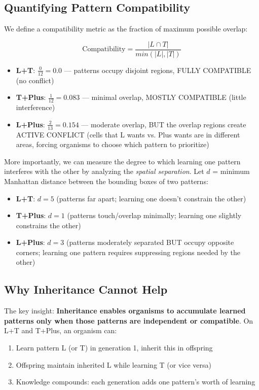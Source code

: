 \documentclass[12pt]{article}
\begin{document}
\subsection*{Quantifying Pattern Compatibility}

We define a compatibility metric as the fraction of maximum possible overlap:

\begin{equation}
\text{Compatibility} = \frac{|L \cap T|}{min(|L|, |T|)}
\end{equation}

\begin{itemize}
\item \textbf{L+T}: $\frac{0}{12} = 0.0$ — patterns occupy disjoint regions, FULLY COMPATIBLE (no conflict)
\item \textbf{T+Plus}: $\frac{1}{12} = 0.083$ — minimal overlap, MOSTLY COMPATIBLE (little interference)
\item \textbf{L+Plus}: $\frac{2}{13} = 0.154$ — moderate overlap, BUT the overlap regions create ACTIVE CONFLICT (cells that L wants vs. Plus wants are in different areas, forcing organisms to choose which pattern to prioritize)
\end{itemize}

More importantly, we can measure the degree to which learning one pattern interferes with the other by analyzing the \textit{spatial separation}. Let $d$ = minimum Manhattan distance between the bounding boxes of two patterns:

\begin{itemize}
\item \textbf{L+T}: $d = 5$ (patterns far apart; learning one doesn't constrain the other)
\item \textbf{T+Plus}: $d = 1$ (patterns touch/overlap minimally; learning one slightly constrains the other)
\item \textbf{L+Plus}: $d = 3$ (patterns moderately separated BUT occupy opposite corners; learning one pattern requires suppressing regions needed by the other)
\end{itemize}

\subsection*{Why Inheritance Cannot Help}

The key insight: \textbf{Inheritance enables organisms to accumulate learned patterns only when those patterns are independent or compatible}. On L+T and T+Plus, an organism can:
\begin{enumerate}
\item Learn pattern L (or T) in generation 1, inherit this in offspring
\item Offspring maintain inherited L while learning T (or vice versa)
\item Knowledge compounds: each generation adds one pattern's worth of learning
\end{enumerate}
\end{document}
